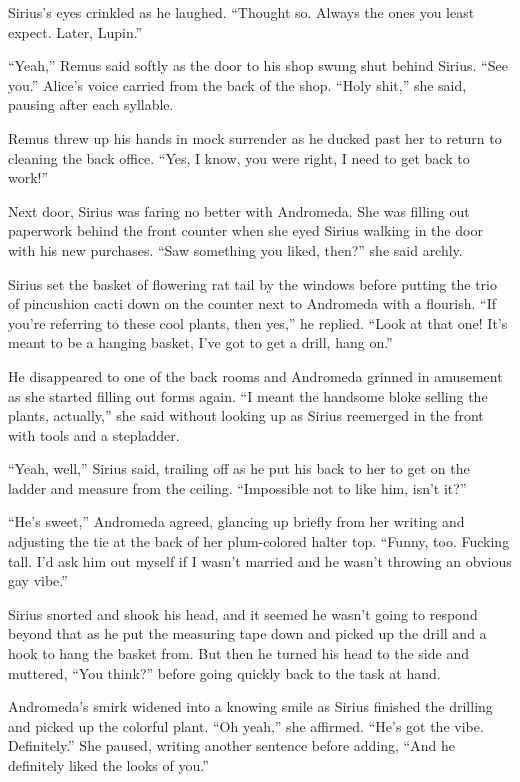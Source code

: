 Sirius’s eyes crinkled as he laughed. “Thought so. Always the ones you least expect. Later, Lupin.”

“Yeah,” Remus said softly as the door to his shop swung shut behind Sirius. “See you.”
Alice’s voice carried from the back of the shop. “Holy shit,” she said, pausing after each syllable.

Remus threw up his hands in mock surrender as he ducked past her to return to cleaning the back office. “Yes, I know, you were right, I need to get back to work!”

Next door, Sirius was faring no better with Andromeda. She was filling out paperwork behind the front counter when she eyed Sirius walking in the door with his new purchases. “Saw something you liked, then?” she said archly.

Sirius set the basket of flowering rat tail by the windows before putting the trio of pincushion cacti down on the counter next to Andromeda with a flourish. “If you’re referring to these cool plants, then yes,” he replied. “Look at that one! It’s meant to be a hanging basket, I’ve got to get a drill, hang on.”

He disappeared to one of the back rooms and Andromeda grinned in amusement as she started filling out forms again. “I meant the handsome bloke selling the plants, actually,” she said without looking up as Sirius reemerged in the front with tools and a stepladder.

“Yeah, well,” Sirius said, trailing off as he put his back to her to get on the ladder and measure from the ceiling. “Impossible not to like him, isn’t it?”

“He’s sweet,” Andromeda agreed, glancing up briefly from her writing and adjusting the tie at the back of her plum-colored halter top. “Funny, too. Fucking tall. I’d ask him out myself if I wasn’t married and he wasn’t throwing an obvious gay vibe.”

Sirius snorted and shook his head, and it seemed he wasn’t going to respond beyond that as he put the measuring tape down and picked up the drill and a hook to hang the basket from. But then he turned his head to the side and muttered, “You think?” before going quickly back to the task at hand.

Andromeda’s smirk widened into a knowing smile as Sirius finished the drilling and picked up the colorful plant. “Oh yeah,” she affirmed. “He’s got the vibe. Definitely.” She paused, writing another sentence before adding, “And he definitely liked the looks of you.”

